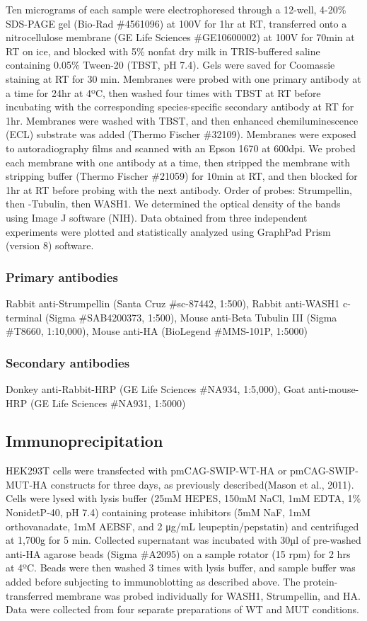 Ten micrograms of each sample were electrophoresed through a 12-well, 4-20\%
SDS-PAGE gel (Bio-Rad \#4561096) at 100V for 1hr at RT, transferred onto a
nitrocellulose membrane (GE Life Sciences \#GE10600002) at 100V for 70min at RT
on ice, and blocked with 5\% nonfat dry milk in TRIS-buffered saline containing
0.05\% Tween-20 (TBST, pH 7.4). Gels were saved for Coomassie staining at RT for
30 min. Membranes were probed with one primary antibody at a time for 24hr at
4ºC, then washed four times with TBST at RT before incubating with the
corresponding species-specific secondary antibody at RT for 1hr. Membranes were
washed with TBST, and then enhanced chemiluminescence (ECL) substrate was added
(Thermo Fischer \#32109). Membranes were exposed to autoradiography films and
scanned with an Epson 1670 at 600dpi. We probed each membrane with one antibody
at a time, then stripped the membrane with stripping buffer (Thermo Fischer
\#21059) for 10min at RT, and then blocked for 1hr at RT before probing with the
next antibody. Order of probes: Strumpellin, then \textbeta-Tubulin, then WASH1.
We determined the optical density of the bands using Image J software (NIH).
Data obtained from three independent experiments were plotted and statistically
analyzed using GraphPad Prism (version 8) software.

\subsubsection{Primary antibodies} Rabbit anti-Strumpellin
(Santa Cruz \#sc-87442, 1:500), Rabbit anti-WASH1 c-terminal (Sigma
\#SAB4200373, 1:500), Mouse anti-Beta Tubulin III (Sigma \#T8660, 1:10,000),
Mouse anti-HA (BioLegend \#MMS-101P, 1:5000)

\subsubsection{Secondary antibodies} Donkey anti-Rabbit-HRP
(GE Life Sciences \#NA934, 1:5,000), Goat anti-mouse-HRP (GE Life Sciences
\#NA931, 1:5000)

\subsection{Immunoprecipitation}

HEK293T cells were transfected with pmCAG-SWIP-WT-HA or pmCAG-SWIP-MUT-HA
constructs for three days, as previously described(Mason et al., 2011). Cells
were lysed with lysis buffer (25mM HEPES, 150mM NaCl, 1mM EDTA, 1\% NonidetP-40,
pH 7.4) containing protease inhibitors (5mM NaF, 1mM orthovanadate, 1mM AEBSF,
and 2 μg/mL leupeptin/pepstatin) and centrifuged at 1,700g for 5 min. Collected
supernatant was incubated with 30µl of pre-washed anti-HA agarose beads (Sigma
\#A2095) on a sample rotator (15 rpm) for 2 hrs at 4ºC. Beads were then washed 3
times with lysis buffer, and sample buffer was added before subjecting to
immunoblotting as described above. The protein-transferred membrane was probed
individually for WASH1, Strumpellin, and HA. Data were collected from four
separate preparations of WT and MUT conditions. 

